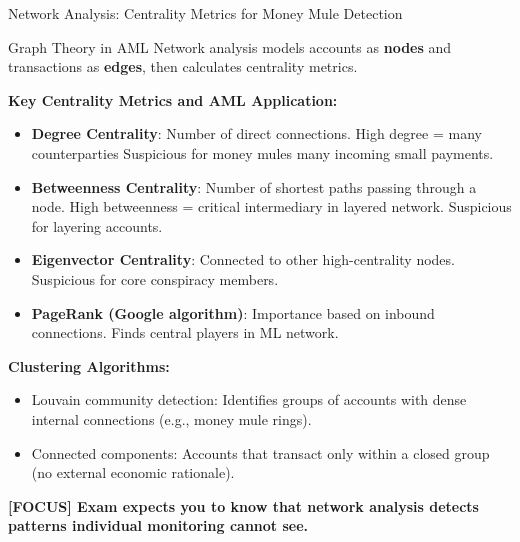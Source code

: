\documentclass[11pt,a4paper]{beamer}
\newcommand{\examfocus}[1]{\textcolor{orange!80!black}{\textbf{[FOCUS] #1}}}
\begin{document}
\begin{frame}{Network Analysis: Centrality Metrics for Money Mule Detection}
	\begin{block}{Graph Theory in AML}
		Network analysis models accounts as \textbf{nodes} and transactions as \textbf{edges}, then calculates centrality metrics.
	\end{block}
	\textbf{Key Centrality Metrics and AML Application:}
	\begin{itemize}
		\item \textbf{Degree Centrality}: Number of direct connections. High degree = many counterparties Suspicious for money mules many incoming small payments. 
		\item \textbf{Betweenness Centrality}: Number of shortest paths passing through a node.
		High betweenness = critical intermediary in layered network. Suspicious for layering accounts. 
		\item \textbf{Eigenvector Centrality}: Connected to other high-centrality nodes.		Suspicious for core conspiracy members.
		\item \textbf{PageRank (Google algorithm)}: Importance based on inbound connections. Finds central players in ML network.
	\end{itemize}
	\textbf{Clustering Algorithms:}
	\begin{itemize}
		\item Louvain community detection: Identifies groups of accounts with dense internal connections (e.g., money mule rings).
		\item Connected components: Accounts that transact only within a closed group (no external economic rationale).
	\end{itemize}
	\examfocus{Exam expects you to know that network analysis detects patterns individual monitoring cannot see.}
\end{frame}
\end{document}
